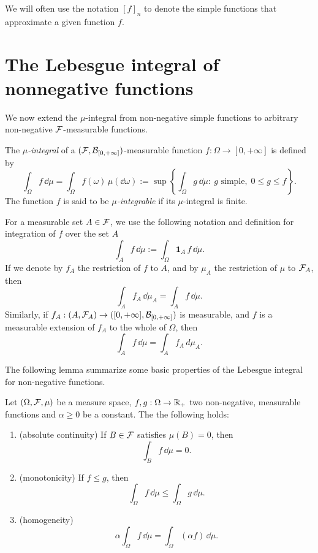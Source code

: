 We will often use the notation $[f]_n$ to denote the simple functions that approximate a given function $f$.

\section{The Lebesgue integral of nonnegative functions}

We now extend the $\mu$-integral from non-negative simple functions to arbitrary non-negative $\mathcal F$-measurable functions.

\begin{definition}\label{def:lebesgue_non_negative}
	The \emph{$\mu$-integral} of a $(\mathcal F,\mathcal B_{[0,+\infty]})$-measurable function $f:\Omega\to[0,+\infty]$ is defined by
\[
	\int_\Omega f\, \dd \mu = \int_\Omega f(\omega)\,\mu(\dd\omega) := \sup\left\{ \int_\Omega g\, \dd \mu : \ g \text{ simple},\; 0 \leq g  \leq f \right\}.
\]
The function $f$ is said to be \emph{$\mu$-integrable} if its $\mu$-integral is finite.
\end{definition}

For a measurable set $A \in \mathcal F$, we use the following notation and definition for integration of $f$ over the set $A$
\[
	\int_A f\, \dd \mu := \int_\Omega \mathbf{1}_A\, f\, \dd \mu.
\]
If we denote by $f_A$ the restriction of $f$ to $A$, and by $\mu_A$ the restriction of $\mu$ to $\mathcal F_A$, then 
\[
\int_A f_A\,\dd \mu_A = \int_A f\, \dd \mu.
\]
Similarly, if $f_A:(A, \mathcal F_A) \to ([0,+\infty],\mathcal B_{[0,+\infty]})$ is measurable, and $f$ is a measurable extension of $f_A$ to the whole of $\Omega$, then
\[
	\int_A f\,\dd \mu = \int_A f_A\, d \mu_A.
\]

The following lemma summarize some basic properties of the Lebesgue integral for non-negative functions.

\begin{lemma}
	\label{pr:properties-integral-nonneg}
	Let $(\Omega, \mathcal F, \mu)$ be a measure space, $f, g : \Omega \to \mathbb R_+$ two non-negative, measurable functions and $\alpha \geq 0$ be a constant. The the following holds:
	\begin{enumerate}
		\item (absolute continuity) If $B \in \mathcal F$ satisfies $\mu(B) = 0$, then
		\[
		\int_{B} f\, \dd \mu = 0. 
		\]
		\item (monotonicity) If $f \leq g$, then
		\[
		\int_\Omega f\, \dd \mu \leq \int_\Omega g\, \dd \mu.
		\]
		\item (homogeneity)
		\[
			\alpha \int_\Omega f\, \dd \mu = \int_\Omega (\alpha f )\,\dd \mu.
		\]
	\end{enumerate}
\end{lemma}

